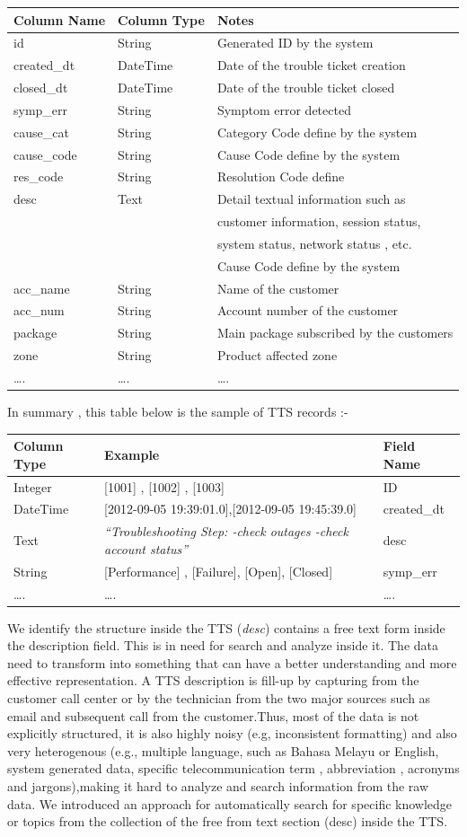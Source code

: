 \documentclass[]{article}
\begin{document}
\begin{longtable}[c]{@{}lll@{}}
\toprule
Column Name & Column Type & Notes\tabularnewline
\midrule
\endhead
id & String & Generated ID by the system\tabularnewline
created\_dt & DateTime & Date of the trouble ticket
creation\tabularnewline
closed\_dt & DateTime & Date of the trouble ticket closed\tabularnewline
symp\_err & String & Symptom error detected\tabularnewline
cause\_cat & String & Category Code define by the system\tabularnewline
cause\_code & String & Cause Code define by the system\tabularnewline
res\_code & String & Resolution Code define\tabularnewline
desc & Text & Detail textual information such as\tabularnewline
& & customer information, session status,\tabularnewline
& & system status, network status , etc.\tabularnewline
& & Cause Code define by the system\tabularnewline
acc\_name & String & Name of the customer\tabularnewline
acc\_num & String & Account number of the customer\tabularnewline
package & String & Main package subscribed by the
customers\tabularnewline
zone & String & Product affected zone\tabularnewline
\ldots{}. & \ldots{}. & \ldots{}.\tabularnewline
\bottomrule
\end{longtable}

\newpage

In summary , this table below is the sample of TTS records :-

\begin{longtable}[c]{@{}lll@{}}
\toprule
Column Type & Example & Field Name\tabularnewline
\midrule
\endhead
Integer & {[}1001{]} , {[}1002{]} , {[}1003{]} & ID\tabularnewline
DateTime & {[}2012-09-05 19:39:01.0{]},{[}2012-09-05 19:45:39.0{]} &
created\_dt\tabularnewline
Text & \emph{``Troubleshooting Step: -check outages -check account
status''} & desc\tabularnewline
String & {[}Performance{]} , {[}Failure{]}, {[}Open{]}, {[}Closed{]} &
symp\_err\tabularnewline
\ldots{}. & \ldots{}. & \ldots{}.\tabularnewline
\bottomrule
\end{longtable}

We identify the structure inside the TTS (\emph{desc}) contains a free
text form inside the description field. This is in need for search and
analyze inside it. The data need to transform into something that can
have a better understanding and more effective representation. A TTS
description is fill-up by capturing from the customer call center or by
the technician from the two major sources such as email and subsequent
call from the customer.Thus, most of the data is not explicitly
structured, it is also highly noisy (e.g, inconsistent formatting) and
also very heterogenous (e.g., multiple language, such as Bahasa Melayu
or English, system generated data, specific telecommunication term ,
abbreviation , acronyms and jargons),making it hard to analyze and
search information from the raw data. We introduced an approach for
automatically search for specific knowledge or topics from the
collection of the free from text section (desc) inside the TTS.
\end{document}
